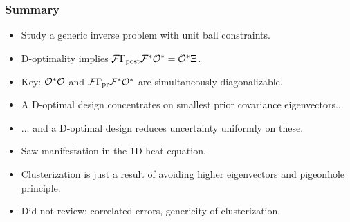 \documentclass{beamer}
\begin{document}
\begin{frame}
  \frametitle{Summary}
  \begin{itemize}
  \item Study a generic inverse problem with unit ball constraints.
  \item D-optimality implies \(\mathcal{F} \Gamma_{\textup{post}}\mathcal{F}^* \mathcal{O}^* = \mathcal{O}^* \Xi\).
  \item Key: $\mathcal{O}^*\mathcal{O}$ and \(\mathcal{F} \Gamma_{\textup{pr}}\mathcal{F}^* \mathcal{O}^*\) are
    simultaneously diagonalizable.
  \item A D-optimal design concentrates on smallest prior covariance eigenvectors...
  \item ... and a D-optimal design reduces uncertainty uniformly on these.
  \item Saw manifestation in the 1D heat equation.
  \item Clusterization is just a result of avoiding higher eigenvectors
    and pigeonhole principle.
  \item Did not review: correlated errors, genericity of clusterization.
  \end{itemize}
\end{frame}
\end{document}
